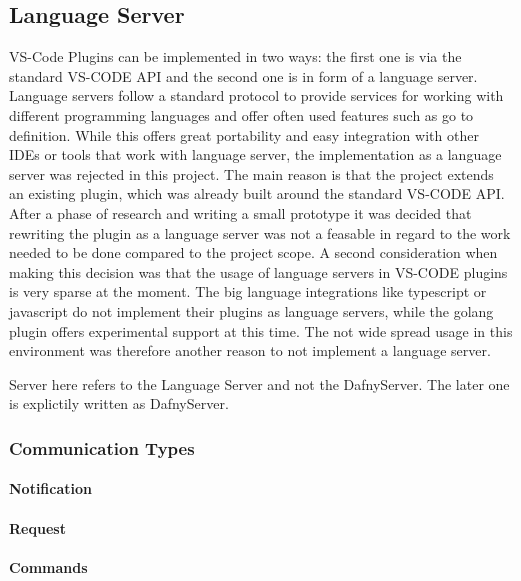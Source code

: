 \subsection{Language Server}

VS-Code Plugins can be implemented in two ways: the first one is via the standard VS-CODE API and the second one is in form of a language server. Language servers follow a standard protocol to provide services for working with different programming languages and offer often used features such as go to definition. While this offers great portability and easy integration with other IDEs or tools that work with language server, the implementation as a language server was rejected in this project. \newline
The main reason is that the project extends an existing plugin, which was already built around the standard VS-CODE API. After a phase of research and writing a small prototype it was decided that rewriting the plugin as a language server was not a feasable in regard to the work needed to be done compared to the project scope. \newline
A second consideration when making this decision was that the usage of language servers in VS-CODE plugins is very sparse at the moment. The big language integrations like typescript or javascript do not implement their plugins as language servers, while the golang plugin offers experimental support at this time. The not wide spread usage in this environment was therefore another reason to not implement a language server.


Server here refers to the Language Server and not the DafnyServer. The later one is explictily written as DafnyServer.

\subsubsection{Communication Types}

\paragraph{Notification}

\paragraph{Request}

\paragraph{Commands}


